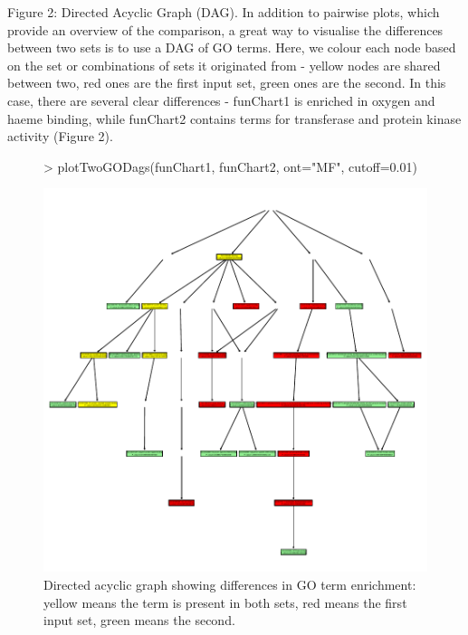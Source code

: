 \documentclass[11pt, oneside]{article}
\begin{document}
Figure 2: Directed Acyclic Graph (DAG). In addition to pairwise plots, which provide an overview of the comparison, a great way to visualise the differences between two sets is to use a DAG of GO terms. Here, we colour each node based on the set or combinations of sets it originated from - yellow nodes are shared between two, red ones are the first input set, green ones are the second. In this case, there are several clear differences - funChart1 is enriched in oxygen and haeme binding, while funChart2 contains terms for transferase and protein kinase activity (Figure 2).\\
\begin{figure}
\begin{center}
\begin{Schunk}
\begin{Sinput}
> plotTwoGODags(funChart1, funChart2, ont="MF", cutoff=0.01)
\end{Sinput}
\end{Schunk}
\includegraphics{CompGO-fig2}
\end{center}
\caption{Directed acyclic graph showing differences in GO term enrichment: yellow means the term is present in both sets, red means the first input set, green means the second.}
\label{fig:two}
\end{figure}
\end{document}
